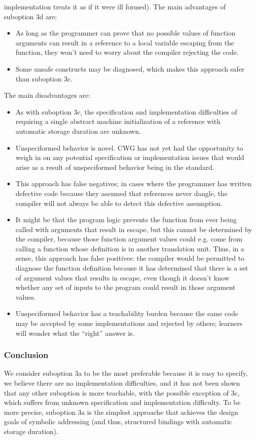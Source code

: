 \documentclass{wg21}
\begin{document}
implementation treats it as if it were ill formed). The main advantages of
suboption 3d are:
\begin{itemize}
\item As long as the programmer can prove that no possible values of function
arguments can result in a  reference to a local variable
escaping from the function, they won't need to worry about the compiler
rejecting the code.
\item Some unsafe constructs may be diagnosed, which makes this approach safer
than suboption 3c.
\end{itemize}
The main disadvantages are:
\begin{itemize}
\item As with suboption 3c, the specification and implementation difficulties of
requiring a single abstract machine initialization of a 
reference with automatic storage duration are unknown.
\item Unspeciformed behavior is novel. CWG has not yet had the opportunity to
weigh in on any potential specification or implementation issues that would
arise as a result of unspeciformed behavior being in the standard.
\item This approach has false negatives; in cases where the programmer has
written defective code because they assumed that  references
never dangle, the compiler will not always be able to detect this defective
assumption.
\item It might be that the program logic prevents the function from ever being
called with arguments that result in escape, but this cannot be determined by
the compiler, because those function argument values could e.g. come from
calling a function whose definition is in another translation unit. Thus, in a
sense, this approach has false positives: the compiler would be permitted to
diagnose the function definition because it has determined that there is a set
of argument values that results in escape, even though it doesn't know whether
any set of inputs to the program could result in those argument values.
\item Unspeciformed behavior has a teachability burden because the same code may
be accepted by some implementations and rejected by others; learners will wonder
what the ``right'' answer is.
\end{itemize}

\subsubsection{Conclusion}
We consider suboption 3a to be the most preferable because it is easy to
specify, we believe there are no implementation difficulties, and it has not
been shown that any other suboption is more teachable, with the possible
exception of 3c, which suffers from unknown specification and implementation
difficulty. To be more precise, suboption 3a is the simplest approache that
achieves the design goals of symbolic addressing (and thus, 
structured bindings with automatic storage duration).
\end{document}
